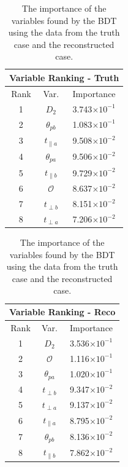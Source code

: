 \documentclass[10pt,a4paper]{book}
\begin{document}
\begin{table}
    \begin{minipage}{.5\linewidth}
      \centering
        \begin{tabular}{|c|c|c|}
	\hline 
	\multicolumn{3}{|c|}{Variable Ranking - Truth} \\ 
	\hline 
	Rank & Var. & Importance \\ 
	\hline 
	1 & $D_2$ & 3.743$\times 10^{-1}$ \\ 
	\hline 
	2 & $\theta_{pb}$ & 1.083$\times 10^{-1}$ \\ 
	\hline 
	3 & $t_{\parallel a}$ & 9.508$\times 10^{-2}$ \\ 
	\hline 
	4 & $\theta_{pa}$ & 9.506$\times 10^{-2}$ \\ 
	\hline 
	5 & $t_{\parallel b}$ & 9.729$\times 10^{-2}$ \\ 
	\hline 
	6 & $\mathcal{O}$  & 8.637$\times 10^{-2}$ \\ 
	\hline 
	7 & $t_{\perp b}$ & 8.151$\times 10^{-2}$ \\ 
	\hline 
	8 & $t_{\perp a}$& 7.206$\times 10^{-2}$ \\ 
	\hline 
	\end{tabular} 
    \end{minipage}%
    \begin{minipage}{.5\linewidth}
      \centering
        \begin{tabular}{|c|c|c|}
	\hline 
	\multicolumn{3}{|c|}{Variable Ranking - Reco} \\ 
	\hline 
	Rank & Var. & Importance \\ 
	\hline 
	1 & $D_2$ & 3.536$\times 10^{-1}$ \\ 
	\hline 
	2 & $\mathcal{O}$ & 1.116$\times 10^{-1}$ \\ 
	\hline 
	3 & $\theta_{pa}$ & 1.020$\times 10^{-1}$ \\ 
	\hline 
	4 & $t_{\perp b}$ & 9.347$\times 10^{-2}$ \\ 
	\hline 
	5 & $t_{\perp a}$ & 9.137$\times 10^{-2}$ \\ 
	\hline 
	6 & $t_{\parallel a}$  & 8.795$\times 10^{-2}$ \\ 
	\hline 
	7 & $\theta_{pb}$ & 8.136$\times 10^{-2}$ \\ 
	\hline 
	8 & $t_{\parallel b}$ & 7.862$\times 10^{-2}$ \\ 
	\hline 
	\end{tabular}  
    \end{minipage} 
    \caption{The importance of the variables found by the BDT using the data from the truth case and the reconstructed case.}
    \label{variable ranking}
\end{table}
\end{document}
